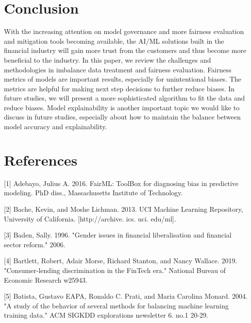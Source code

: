 \documentclass{article}
\begin{document}
\section{Conclusion}
With the increasing attention on model governance and more fairness evaluation and mitigation tools becoming available, the AI/ML solutions built in the financial industry will gain more trust from the customers and thus become more beneficial to the industry. In this paper, we review the challenges and methodologies in imbalance data treatment and fairness evaluation. Fairness metrics of models are important results, especially for unintentional biases. The metrics are helpful for making next step decisions to further reduce biases. In future studies, we will present a more sophisticated algorithm to fit the data and reduce biases. Model explainability is another important topic we would like to discuss in future studies, especially about how to maintain the balance between model accuracy and explainability.








\section*{References}

\small

[1] Adebayo, Julius A. 2016. FairML: ToolBox for diagnosing bias in predictive modeling. PhD diss., Massachusetts Institute of Technology.

[2] Bache, Kevin, and Moshe Lichman. 2013. UCI Machine Learning Repository, University of California. [http://archive. ics. uci. edu/ml].

[3] Baden, Sally. 1996. "Gender issues in financial liberalisation and financial sector reform." 2006.

[4] Bartlett, Robert, Adair Morse, Richard Stanton, and Nancy Wallace. 2019. "Consumer-lending discrimination in the FinTech era." National Bureau of Economic Research w25943.

[5] Batista, Gustavo EAPA, Ronaldo C. Prati, and Maria Carolina Monard. 2004. "A study of the behavior of several methods for balancing machine learning training data." ACM SIGKDD explorations newsletter 6. no.1 20-29.
\end{document}
